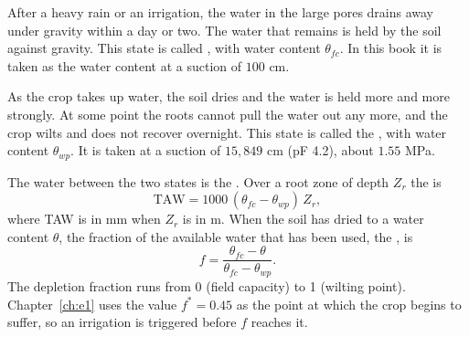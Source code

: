  After a heavy rain or an irrigation, the water in the large pores drains away under gravity within a day or two. The water that remains is held by the soil against gravity. This state is called , with water content $\theta_{fc}$. In this book it is taken as the water content at a suction of $100$ cm.

 As the crop takes up water, the soil dries and the water is held more and more strongly. At some point the roots cannot pull the water out any more, and the crop wilts and does not recover overnight. This state is called the , with water content $\theta_{wp}$. It is taken at a suction of $15{,}849$ cm (pF 4.2), about $1.55$ MPa.

\par\noindent The water between the two states is the . Over a root zone of depth $Z_r$ the  is
\begin{equation}\label{eq:fd-taw}\boxed{\mathrm{TAW}=1000\,(\theta_{fc}-\theta_{wp})\,Z_r,}\end{equation}
where TAW is in mm when $Z_r$ is in m. When the soil has dried to a water content $\theta$, the fraction of the available water that has been used, the , is
\begin{equation}\label{eq:fd-f}\boxed{f=\frac{\theta_{fc}-\theta}{\theta_{fc}-\theta_{wp}} .}\end{equation}
The depletion fraction runs from 0 (field capacity) to 1 (wilting point). Chapter~\ref{ch:e1} uses the value $f^*=0.45$ as the point at which the crop begins to suffer, so an irrigation is triggered before $f$ reaches it.

